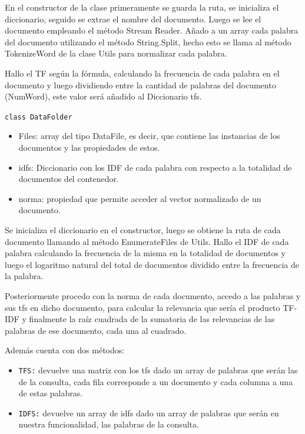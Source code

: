 \documentclass[a4paper, 12pt]{article}
\begin{document}
En el constructor de la clase primeramente se guarda la ruta, se inicializa el
diccionario, seguido se extrae el nombre del documento. Luego se lee el
documento empleando el método Stream Reader. Añado a un array cada palabra
del documento utilizando el método String.Split, hecho esto se llama al método
TokenizeWord de la clase Utils para normalizar cada palabra.


Hallo el TF según la fórmula, calculando la frecuencia de
cada palabra en el documento y luego dividiendo entre la cantidad de palabras del
documento (NumWord), este valor será añadido al Diccionario tfs.
\vspace{0.5cm}

{\tt class DataFolder}
\begin{itemize}
    \item Files: array del tipo DataFile, es decir, que contiene las instancias de los documentos y las propiedades de estos.
    \item idfs: Diccionario con los IDF de cada palabra con respecto a la totalidad de documentos del contenedor.
    \item norma: propiedad que permite acceder al vector normalizado de un documento.
\end{itemize}


Se inicializa el diccionario en el constructor, luego se obtiene la ruta de cada
documento llamando al método EnumerateFiles de Utils. Hallo el IDF de cada
palabra calculando la frecuencia de la misma en la totalidad de documentos y luego
el logaritmo natural del total de documentos dividido entre la frecuencia de la
palabra. 

Posteriormente procedo con la norma de cada documento, accedo a las palabras y
sus tfs en dicho documento, para calcular la relevancia que sería el producto TF-IDF
y finalmente la raíz cuadrada de la sumatoria
de las relevancias de las palabras de ese documento, cada una al cuadrado.



Además cuenta con dos métodos:
\begin{itemize}
    \item {\tt TFS:} devuelve una matriz con los tfs dado un array de palabras que serán las de la consulta, cada fila corresponde a un documento y cada columna a una de estas palabras.
    \item {\tt IDFS:} devuelve un array de idfs dado un array de palabras que serán en nuestra funcionalidad, las palabras de la consulta.
\end{itemize}
\end{document}
